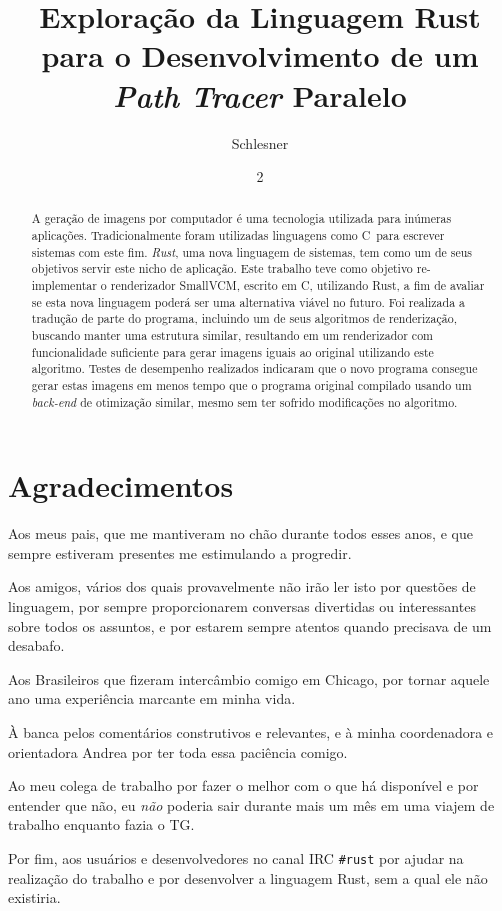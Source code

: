 \documentclass[tg]{mdtufsm}
\title{Exploração da Linguagem Rust para o Desenvolvimento de um \emph{Path Tracer} Paralelo}
\author{Schlesner}{Yuri Kunde}
\institute{Centro de Tecnologia}
\date{2}{Dezembro}{2014}
\def\Cpp{{C\nolinebreak[4]\raisebox{.20ex}{\small\bf++}}}
\begin{document}
\maketitle


\chapter*{Agradecimentos}
Aos meus pais, que me mantiveram no chão durante todos esses anos, e que sempre estiveram presentes me estimulando a progredir.

Aos amigos, vários dos quais provavelmente não irão ler isto por questões de linguagem, por sempre proporcionarem conversas divertidas ou interessantes sobre todos os assuntos, e por estarem sempre atentos quando precisava de um desabafo.

Aos Brasileiros que fizeram intercâmbio comigo em Chicago, por tornar aquele ano uma experiência marcante em minha vida.

À banca pelos comentários construtivos e relevantes, e à minha coordenadora e orientadora Andrea por ter toda essa paciência comigo.

Ao meu colega de trabalho por fazer o melhor com o que há disponível e por entender que não, eu \emph{não} poderia sair durante mais um mês em uma viajem de trabalho enquanto fazia o TG.

Por fim, aos usuários e desenvolvedores no canal IRC \texttt{\#rust} por ajudar na realização do trabalho e por desenvolver a linguagem Rust, sem a qual ele não existiria.

\begin{abstract}
A geração de imagens por computador é uma tecnologia utilizada para inúmeras aplicações.
Tradicionalmente foram utilizadas linguagens como \Cpp\ para escrever sistemas com este fim. \emph{Rust},
uma nova linguagem de sistemas, tem como um de seus objetivos servir este nicho de aplicação. Este
trabalho teve como objetivo re-implementar o renderizador SmallVCM, escrito em \Cpp, utilizando
Rust, a fim de avaliar se esta nova linguagem poderá ser uma alternativa viável no futuro. Foi
realizada a tradução de parte do programa, incluindo um de seus algoritmos de renderização, buscando
manter uma estrutura similar, resultando em um renderizador com funcionalidade suficiente para gerar
imagens iguais ao original utilizando este algoritmo. Testes de desempenho realizados indicaram que
o novo programa consegue gerar estas imagens em menos tempo que o programa original compilado usando
um \emph{back-end} de otimização similar, mesmo sem ter sofrido modificações no algoritmo.
\end{abstract}
\end{document}
